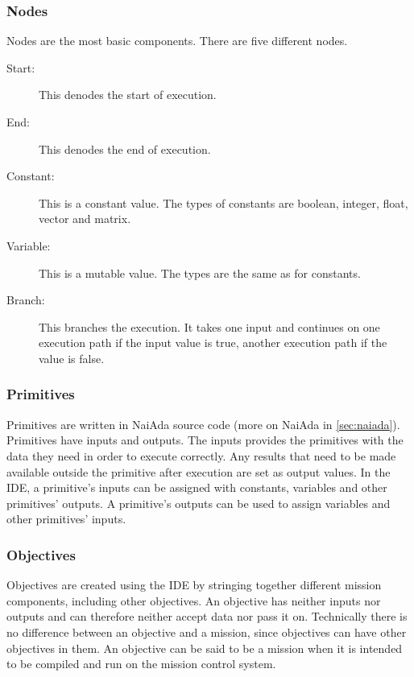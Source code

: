 \subsubsection{Nodes}
Nodes are the most basic components. There are five different nodes.
\begin{description}
\item[Start:] This denodes the start of execution.
\item[End:] This denodes the end of execution.
\item[Constant:] This is a constant value. The types of constants are boolean, integer, float, vector and matrix.
\item[Variable:] This is a mutable value. The types are the same as for constants.
\item[Branch:] This branches the execution. It takes one input and continues on one execution path if the input value is true, another execution path if the value is false.
\end{description}

\subsubsection{Primitives}
\label{sec:primitives}
Primitives are written in NaiAda source code (more on NaiAda in \cref{sec:naiada}). Primitives have inputs and outputs. The inputs provides the primitives with the data they need in order to execute correctly. Any results that need to be made available outside the primitive after execution are set as output values. In the IDE, a primitive's inputs can be assigned with constants, variables and other primitives' outputs. A primitive's outputs can be
used to assign variables and other primitives' inputs.

\subsubsection{Objectives}
Objectives are created using the IDE by stringing together different mission components, including other objectives. An objective has neither inputs nor outputs and can therefore neither accept data nor pass it on. Technically there is no difference between an objective and a mission, since objectives can have other objectives in them. An objective can be said to be a mission when it is intended to be compiled and run on the mission control system.
